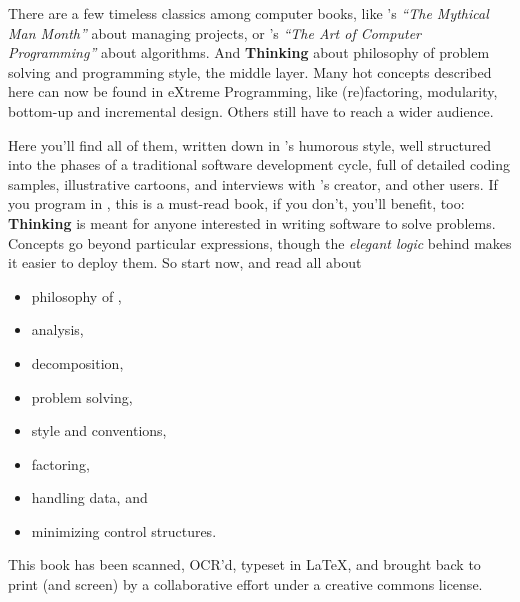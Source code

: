 
\noindent
There are a few timeless classics among computer books, like 's \emph{``The Mythical Man Month''} about managing projects, or
's \emph{``The Art of Computer Programming''} about
algorithms. And \textbf{Thinking \Forth} about philosophy of problem
solving and programming style, the middle layer. Many hot concepts
described here can now be found in eXtreme Programming, like
(re)factoring, modularity, bottom-up and incremental design. Others
still have to reach a wider audience.

Here you'll find all of them, written down in 's
humorous style, well structured into the phases of a traditional
software development cycle, full of detailed coding samples,
illustrative cartoons, and interviews with \Forth's creator,
 and other
\Forth{} users. If you program in \Forth{}, this is a must-read book,
if you don't, you'll benefit, too: \textbf{Thinking \Forth{}} is meant
for anyone interested in writing software to solve problems.  Concepts
go beyond particular expressions, though the \emph{elegant logic}
behind \Forth{} makes it easier to deploy them. So start now, and read
all about
\begin{itemize}
\item philosophy of \Forth{},
\item analysis,
\item decomposition,
\item problem solving,
\item style and conventions,
\item factoring,
\item handling data, and
\item minimizing control structures.
\end{itemize}

This book has been scanned, OCR'd, typeset in \LaTeX{}, and brought
back to print (and screen) by a collaborative effort under a creative
commons license.

